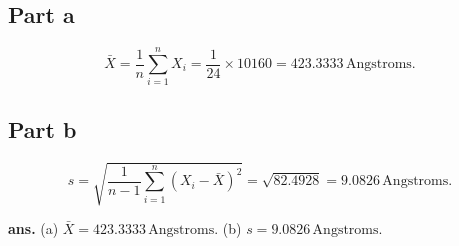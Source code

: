 \documentclass[12pt]{article}
\begin{document}
\subsection*{Part a}

\[
\bar{X} = \frac{1}{n} \sum_{i=1}^{n} X_i = \frac{1}{24} \times 10160 = 423.3333 \, \text{Angstroms}.
\]
\AnswerTag

\subsection*{Part b}


\[
s = \sqrt{\frac{1}{n-1} \sum_{i=1}^{n} (X_i - \bar{X})^2} = \sqrt{82.4928} = 9.0826 \, \text{Angstroms}.
\]
\AnswerTag



\vfill
\begin{flushright}
\textbf{ans.} (a) \(\bar{X} = 423.3333 \, \text{Angstroms}.\) (b) \(s= 9.0826 \, \text{Angstroms}.\)
\end{flushright}
\end{document}
